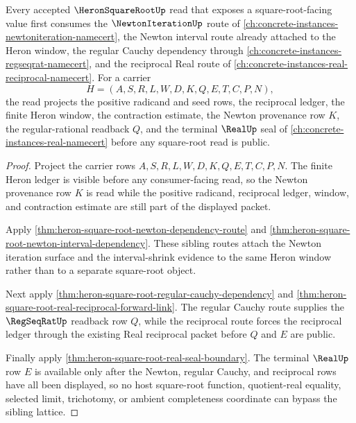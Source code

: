 \begin{theorem}
\label{thm:heron-square-root-newton-sibling-lattice}
Every accepted $\HeronSquareRootUp$ read that exposes a square-root-facing value first consumes the $\NewtonIterationUp$ route of \autoref{ch:concrete-instances-newtoniteration-namecert}, the Newton interval route already attached to the Heron window, the regular Cauchy dependency through \autoref{ch:concrete-instances-regseqrat-namecert}, and the reciprocal Real route of \autoref{ch:concrete-instances-real-reciprocal-namecert}. For a carrier
$$
H=(A,S,R,L,W,D,K,Q,E,T,C,P,N),
$$
the read projects the positive radicand and seed rows, the reciprocal ledger, the finite Heron window, the contraction estimate, the Newton provenance row $K$, the regular-rational readback $Q$, and the terminal $\RealUp$ seal of \autoref{ch:concrete-instances-real-namecert} before any square-root read is public.
\end{theorem}
\begin{proof}
Project the carrier rows $A,S,R,L,W,D,K,Q,E,T,C,P,N$. The finite Heron ledger is visible before any consumer-facing read, so the Newton provenance row $K$ is read while the positive radicand, reciprocal ledger, window, and contraction estimate are still part of the displayed packet.

Apply \autoref{thm:heron-square-root-newton-dependency-route} and \autoref{thm:heron-square-root-newton-interval-dependency}. These sibling routes attach the Newton iteration surface and the interval-shrink evidence to the same Heron window rather than to a separate square-root object.

Next apply \autoref{thm:heron-square-root-regular-cauchy-dependency} and \autoref{thm:heron-square-root-real-reciprocal-forward-link}. The regular Cauchy route supplies the $\RegSeqRatUp$ readback row $Q$, while the reciprocal route forces the reciprocal ledger through the existing Real reciprocal packet before $Q$ and $E$ are public.

Finally apply \autoref{thm:heron-square-root-real-seal-boundary}. The terminal $\RealUp$ row $E$ is available only after the Newton, regular Cauchy, and reciprocal rows have all been displayed, so no host square-root function, quotient-real equality, selected limit, trichotomy, or ambient completeness coordinate can bypass the sibling lattice.
\end{proof}
